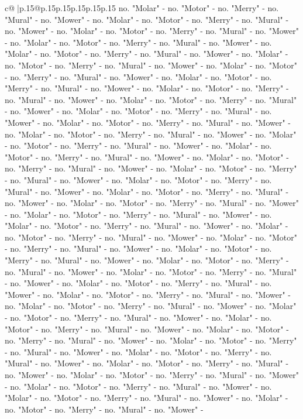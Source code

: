 \documentclass{article}
\begin{document}
{\begin{supertabular}{c@{$\;$}|p{.15\linewidth}@{}p{.15\linewidth}p{.15\linewidth}p{.15\linewidth}p{.15\linewidth}p{.15\linewidth}}
{{{no. "Molar" {-} no. "Motor" {-} no. "Merry" {-} no. "Mural" {-} no. "Mower" {-} no. "Molar" {-} no. "Motor" {-} no. "Merry" {-} no. "Mural" {-} no. "Mower" {-} no. "Molar" {-} no. "Motor" {-} no. "Merry" {-} no. "Mural" {-} no. "Mower" {-} no. "Molar" {-} no. "Motor" {-} no. "Merry" {-} no. "Mural" {-} no. "Mower" {-} no. "Molar" {-} no. "Motor" {-} no. "Merry" {-} no. "Mural" {-} no. "Mower" {-} no. "Molar" {-} no. "Motor" {-} no. "Merry" {-} no. "Mural" {-} no. "Mower" {-} no. "Molar" {-} no. "Motor" {-} no. "Merry" {-} no. "Mural" {-} no. "Mower" {-} no. "Molar" {-} no. "Motor" {-} no. "Merry" {-} no. "Mural" {-} no. "Mower" {-} no. "Molar" {-} no. "Motor" {-} no. "Merry" {-} no. "Mural" {-} no. "Mower" {-} no. "Molar" {-} no. "Motor" {-} no. "Merry" {-} no. "Mural" {-} no. "Mower" {-} no. "Molar" {-} no. "Motor" {-} no. "Merry" {-} no. "Mural" {-} no. "Mower" {-} no. "Molar" {-} no. "Motor" {-} no. "Merry" {-} no. "Mural" {-} no. "Mower" {-} no. "Molar" {-} no. "Motor" {-} no. "Merry" {-} no. "Mural" {-} no. "Mower" {-} no. "Molar" {-} no. "Motor" {-} no. "Merry" {-} no. "Mural" {-} no. "Mower" {-} no. "Molar" {-} no. "Motor" {-} no. "Merry" {-} no. "Mural" {-} no. "Mower" {-} no. "Molar" {-} no. "Motor" {-} no. "Merry" {-} no. "Mural" {-} no. "Mower" {-} no. "Molar" {-} no. "Motor" {-} no. "Merry" {-} no. "Mural" {-} no. "Mower" {-} no. "Molar" {-} no. "Motor" {-} no. "Merry" {-} no. "Mural" {-} no. "Mower" {-} no. "Molar" {-} no. "Motor" {-} no. "Merry" {-} no. "Mural" {-} no. "Mower" {-} no. "Molar" {-} no. "Motor" {-} no. "Merry" {-} no. "Mural" {-} no. "Mower" {-} no. "Molar" {-} no. "Motor" {-} no. "Merry" {-} no. "Mural" {-} no. "Mower" {-} no. "Molar" {-} no. "Motor" {-} no. "Merry" {-} no. "Mural" {-} no. "Mower" {-} no. "Molar" {-} no. "Motor" {-} no. "Merry" {-} no. "Mural" {-} no. "Mower" {-} no. "Molar" {-} no. "Motor" {-} no. "Merry" {-} no. "Mural" {-} no. "Mower" {-} no. "Molar" {-} no. "Motor" {-} no. "Merry" {-} no. "Mural" {-} no. "Mower" {-} no. "Molar" {-} no. "Motor" {-} no. "Merry" {-} no. "Mural" {-} no. "Mower" {-} no. "Molar" {-} no. "Motor" {-} no. "Merry" {-} no. "Mural" {-} no. "Mower" {-} no. "Molar" {-} no. "Motor" {-} no. "Merry" {-} no. "Mural" {-} no. "Mower" {-} no. "Molar" {-} no. "Motor" {-} no. "Merry" {-} no. "Mural" {-} no. "Mower" {-} no. "Molar" {-} no. "Motor" {-} no. "Merry" {-} no. "Mural" {-} no. "Mower" {-} no. "Molar" {-} no. "Motor" {-} no. "Merry" {-} no. "Mural" {-} no. "Mower" {-} no. "Molar" {-} no. "Motor" {-} no. "Merry" {-} no. "Mural" {-} no. "Mower" {-} no. "Molar" {-} no. "Motor" {-} no. "Merry" {-} no. "Mural" {-} no. "Mower" {-} no. "Molar" {-} no. "Motor" {-} no. "Merry" {-} no. "Mural" {-} no. "Mower" {-} no. "Molar" {-} no. "Motor" {-} no. "Merry" {-} no. "Mural" {-} no. "Mower" {-} no. "Molar" {-} no. "Motor" {-} no. "Merry" {-} no. "Mural" {-} no. "Mower" {-} no. "Molar" {-} no. "Motor" {-} no. "Merry" {-} no. "Mural" {-} no. "Mower" {-} no. "Molar" {-} no. "Motor" {-} no. "Merry" {-} no. "Mural" {-} no. "Mower" {-} no. "Molar" {-} no. "Motor" {-} no. "Merry" {-} no. "Mural" {-} no. "Mower" {-} no. "Molar" {-} no. "Motor" {-} no. "Merry" {-} no. "Mural" {-} no. "Mower" {-} }}}
\end{supertabular}}
\end{document}
